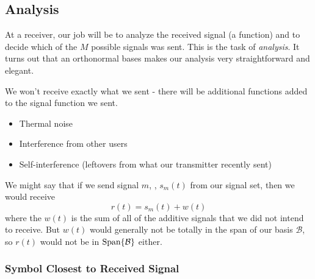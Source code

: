 \subsection{Analysis}

At a receiver, our job will be to analyze the received signal (a function) and to decide which of the $M$ possible signals was sent. This is the task of \emph{analysis}.  It turns out that an orthonormal bases makes our analysis very straightforward and elegant.

We won't receive exactly what we sent - there will be additional
functions added to the signal function we sent.
\begin{itemize}
  \item Thermal noise
  \item Interference from other users
  \item Self-interference (leftovers from what our transmitter recently sent)
\end{itemize}
We might say that if we send signal $m$, \ie, $s_m(t)$ from our signal set, then we would
receive
\[
  r(t) = s_m(t) + w(t)
\]
where the $w(t)$ is the sum of all of the additive signals that we
did not intend to receive.  But  $w(t)$ would generally not be totally  in the span of our basis $\mathcal{B}$, so $r(t)$ would not be in $\mbox{Span} \{ \mathcal{B} \}$ either.  


\subsubsection{Symbol Closest to Received Signal}

